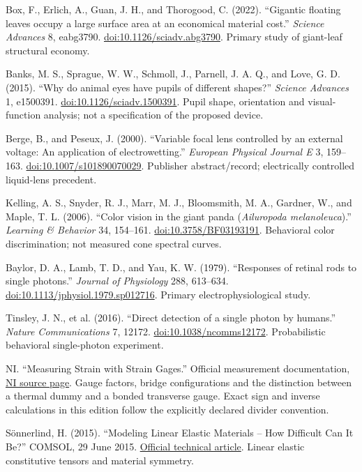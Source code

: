 \documentclass[10pt,a4paper]{article}
\numberwithin{equation}{section}
\begin{document}
\small
\begin{description}[leftmargin=12mm,labelwidth=10mm,labelsep=2mm,itemsep=8pt]
\item[{[R1]}] Box, F., Erlich, A., Guan, J. H., and Thorogood, C. (2022). ``Gigantic floating leaves occupy a large surface area at an economical material cost.'' \emph{Science Advances} 8, eabg3790. \href{https://doi.org/10.1126/sciadv.abg3790}{doi:10.1126/sciadv.abg3790}. Primary study of giant-leaf structural economy.
\item[{[R2]}] Banks, M. S., Sprague, W. W., Schmoll, J., Parnell, J. A. Q., and Love, G. D. (2015). ``Why do animal eyes have pupils of different shapes?'' \emph{Science Advances} 1, e1500391. \href{https://doi.org/10.1126/sciadv.1500391}{doi:10.1126/sciadv.1500391}. Pupil shape, orientation and visual-function analysis; not a specification of the proposed device.
\item[{[R3]}] Berge, B., and Peseux, J. (2000). ``Variable focal lens controlled by an external voltage: An application of electrowetting.'' \emph{European Physical Journal E} 3, 159--163. \href{https://doi.org/10.1007/s101890070029}{doi:10.1007/s101890070029}. Publisher abstract/record; electrically controlled liquid-lens precedent.
\item[{[R4]}] Kelling, A. S., Snyder, R. J., Marr, M. J., Bloomsmith, M. A., Gardner, W., and Maple, T. L. (2006). ``Color vision in the giant panda (\emph{Ailuropoda melanoleuca}).'' \emph{Learning \& Behavior} 34, 154--161. \href{https://doi.org/10.3758/BF03193191}{doi:10.3758/BF03193191}. Behavioral color discrimination; not measured cone spectral curves.
\item[{[R5]}] Baylor, D. A., Lamb, T. D., and Yau, K. W. (1979). ``Responses of retinal rods to single photons.'' \emph{Journal of Physiology} 288, 613--634. \href{https://doi.org/10.1113/jphysiol.1979.sp012716}{doi:10.1113/jphysiol.1979.sp012716}. Primary electrophysiological study.
\item[{[R6]}] Tinsley, J. N., et al. (2016). ``Direct detection of a single photon by humans.'' \emph{Nature Communications} 7, 12172. \href{https://doi.org/10.1038/ncomms12172}{doi:10.1038/ncomms12172}. Probabilistic behavioral single-photon experiment.
\item[{[R7]}] NI. ``Measuring Strain with Strain Gages.'' Official measurement documentation, \href{https://www.ni.com/en/shop/data-acquisition/sensor-fundamentals/measuring-strain-with-strain-gages.html}{NI source page}. Gauge factors, bridge configurations and the distinction between a thermal dummy and a bonded transverse gauge. Exact sign and inverse calculations in this edition follow the explicitly declared divider convention.
\item[{[R8]}] S\"onnerlind, H. (2015). ``Modeling Linear Elastic Materials -- How Difficult Can It Be?'' COMSOL, 29 June 2015. \href{https://www.comsol.com/blogs/modeling-linear-elastic-materials-how-difficult-can-it-be}{Official technical article}. Linear elastic constitutive tensors and material symmetry.
\end{description}
\end{document}
